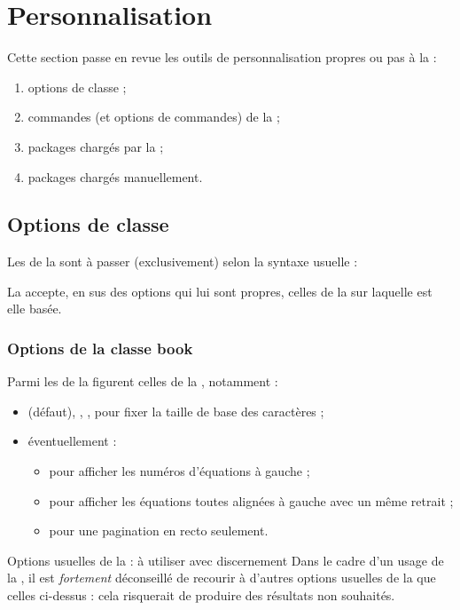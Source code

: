 \chapter{Personnalisation}\label{cha:configuration}

Cette section passe en revue les outils de personnalisation propres
ou pas à la \yatcl{} :
\begin{enumerate}
\item options de classe ;
\item commandes (et options de commandes) de la \yatcl;
\item packages chargés par  la \yatcl ;
\item packages chargés manuellement.
\end{enumerate}

\section{Options de classe}\label{options-classe}

Les  de la \yatcl sont à passer (exclusivement) selon la syntaxe
usuelle :

La \yatcl accepte, en sus des options qui lui sont propres, celles de la
 sur laquelle est elle basée.

\subsection{Options de la classe \textsf{book}}\label{sec:options-usuelles-de}

Parmi les  de la \yatcl figurent celles de la
, notamment :
\begin{itemize}
\item \docAuxKey{10pt} (défaut), \docAuxKey{11pt}, \docAuxKey{12pt}, pour fixer la taille de base des
  caractères ;
\item éventuellement :
  \begin{itemize}
  \item {} pour afficher les numéros d'équations à gauche ;
  \item {} pour afficher les équations toutes alignées à gauche
    avec un même retrait ;
  \item {} pour une pagination en recto seulement.
  \end{itemize}
\end{itemize}
\begin{dbwarning}{Options usuelles de la  : à utiliser
    avec discernement}{}
  Dans le cadre d'un usage de la \yatcl, il est \emph{fortement}
  déconseillé de recourir à d'autres options usuelles de la
   que celles ci-dessus : cela risquerait de produire
  des résultats non souhaités.
\end{dbwarning}

